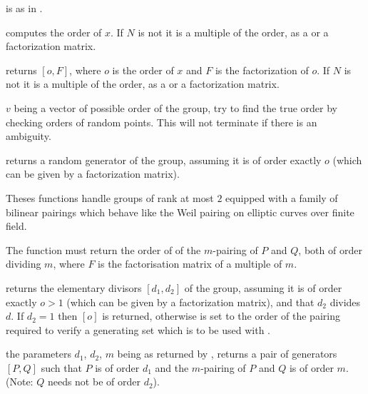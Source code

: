  is as in .

computes the order of $x$. If $N$ is not  it is a multiple of the
order, as a  or a factorization matrix.

returns $[o,F]$, where $o$ is the order of $x$ and $F$ is the factorization
of $o$. If $N$ is not  it is a multiple of the order, as a
 or a factorization matrix.

$v$ being a vector of possible order of the group, try to find the true order
by checking orders of random points. This will not terminate if there is an
ambiguity.

returns a random generator of the group, assuming it is of order exactly
$o$ (which can be given by a factorization matrix).


Theses functions handle groups of rank at most $2$ equipped with a family of
bilinear pairings which behave like the Weil pairing on elliptic curves over
finite field.

The function  must return the order of of the $m$-pairing
of $P$ and $Q$, both of order dividing $m$, where $F$ is the factorisation matrix
of a multiple of $m$.


returns the elementary divisors $[d_1, d_2]$ of the group, assuming it is of order exactly
$o>1$ (which can be given by a factorization matrix), and that $d_2$ divides $d$.
If $d_2=1$ then $[o]$ is returned, otherwise  is set to the order of the
pairing required to verify a generating set which is to be used with .

the parameters $d_1$, $d_2$, $m$ being as returned by , returns a pair
of generators $[P,Q]$ such that $P$ is of order $d_1$ and the $m$-pairing of $P$ and
$Q$ is of order $m$. (Note: $Q$ needs not be of order $d_2$).

